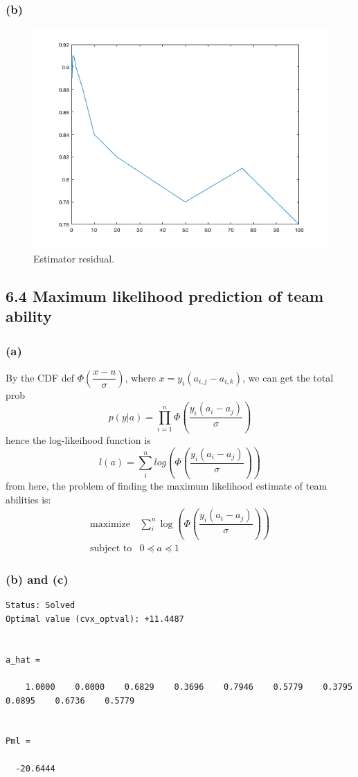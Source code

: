 \documentclass{article}
\begin{document}
\subsubsection*{(b)}

 
  \begin{figure}[h!]
\begin{center}
  \includegraphics[width=.4\linewidth]{prob518.png}
\end{center}
\caption{Estimator residual.}
\end{figure}\subsection*{6.4 Maximum likelihood prediction of team ability}
\subsubsection*{(a)}
By the CDF def $\Phi(\dfrac{x-u}{\sigma})$,  where $x=y_i(a_{i,j}-a_{i,k})$, we can get the total prob 
\[p(y|a)=\prod_{i=1}^{n}\Phi(\dfrac{y_i(a_i-a_j)}{\sigma})\]
hence the log-likeihood function is 
\[l(a) = \sum_{i}^{n}log(\Phi(\dfrac{y_i(a_i-a_j)}{\sigma}))\]
from here, the problem of finding the maximum likelihood estimate of team abilities is:
 \[  \boxed{  \begin{array}{ll}
    \mbox{maximize}   &\sum_{i}^{n}\log(\Phi(\dfrac{y_i(a_i-a_j)}{\sigma})) \\
    \mbox{subject to} & 0 \preceq a \preceq 1
        \end{array} 
   }
  \]   

\subsubsection*{(b) and (c)}
\begin{verbatim}
Status: Solved
Optimal value (cvx_optval): +11.4487
 

a_hat =

    1.0000    0.0000    0.6829    0.3696    0.7946    0.5779    0.3795    0.0895    0.6736    0.5779


Pml =

  -20.6444
 \end{verbatim} 
 
\end{document}
